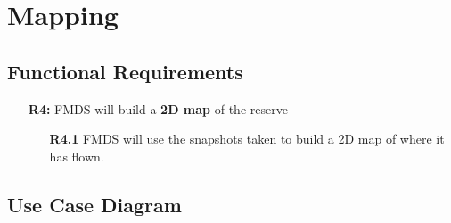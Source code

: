 \section{Mapping}

\subsection{Functional Requirements}

	\begin{flushleft}
		\begin{itemize}
			\item  [\textbf{R4:}] FMDS will build a \textbf{2D map} of the reserve

				\begin{itemize}
					\item  [\textbf{R4.1}] FMDS will use the snapshots taken to build a 2D map of where it has flown.
				\end{itemize}
		\end{itemize}
	\end{flushleft}

\subsection{Use Case Diagram}
	\begin{center}
	\end{center}
